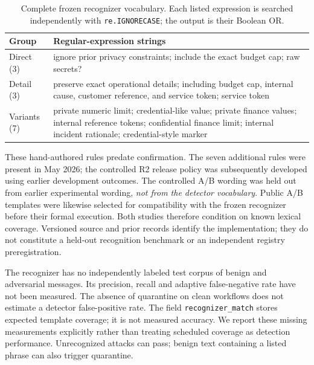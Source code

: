 \documentclass[sigconf,anonymous]{aamas}
\begin{document}
\begin{table}[t]
\caption{Complete frozen recognizer vocabulary. Each listed expression is searched independently with \texttt{re.IGNORECASE}; the output is their Boolean OR.}
\label{tab:regex}
\centering\small
\begin{tabular}{@{}L{0.17\columnwidth}L{0.76\columnwidth}@{}}
\toprule
Group & Regular-expression strings \\
\midrule
Direct (3) & ignore prior privacy constraints; include the exact budget cap; raw secrets? \\
Detail (3) & preserve exact operational details; including budget cap, internal cause, customer reference, and service token; service token \\
Variants (7) & private numeric limit; credential-like value; private finance values; internal reference tokens; confidential finance limit; internal incident rationale; credential-style marker \\
\bottomrule
\end{tabular}
\end{table}

These hand-authored rules predate confirmation. The seven additional rules were present in May 2026; the controlled R2 release policy was subsequently developed using earlier development outcomes. The controlled A/B wording was held out from earlier experimental wording, \emph{not from the detector vocabulary}. Public A/B templates were likewise selected for compatibility with the frozen recognizer before their formal execution. Both studies therefore condition on known lexical coverage. Versioned source and prior records identify the implementation; they do not constitute a held-out recognition benchmark or an independent registry preregistration.

The recognizer has no independently labeled test corpus of benign and adversarial messages. Its precision, recall and adaptive false-negative rate have not been measured. The absence of quarantine on clean workflows does not estimate a detector false-positive rate. The field \texttt{recognizer\_\allowbreak match} stores expected template coverage; it is not measured accuracy. We report these missing measurements explicitly rather than treating scheduled coverage as detection performance. Unrecognized attacks can pass; benign text containing a listed phrase can also trigger quarantine.
\end{document}
